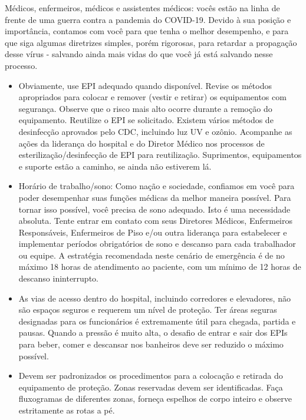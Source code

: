 \documentclass[onecolumn,journal]{IEEEtran}
\begin{document}


\begin{multicols}{2}

Médicos, enfermeiros, médicos e assistentes médicos: vocês estão na linha de frente de uma guerra contra a pandemia do COVID-19. Devido à sua posição e importância, contamos com você para que tenha o melhor desempenho, e para que siga algumas diretrizes simples, porém rigorosas, para retardar a propagação desse vírus - salvando ainda mais vidas do que você já está salvando nesse processo.

\begin{itemize}
    \item Obviamente, use EPI adequado quando disponível. Revise os métodos apropriados para colocar e remover (vestir e retirar) os equipamentos com segurança. Observe que o risco mais alto ocorre durante a remoção do equipamento. Reutilize o EPI se solicitado. Existem vários métodos de desinfecção aprovados pelo CDC, incluindo luz UV e ozônio.  Acompanhe as ações da liderança do hospital e do Diretor Médico nos processos de esterilização/desinfecção de EPI para reutilização. Suprimentos, equipamentos e suporte estão a caminho, se ainda não estiverem lá.
    \item Horário de trabalho/sono: Como nação e sociedade, confiamos em você para poder desempenhar suas funções médicas da melhor maneira possível. Para tornar isso possível, você precisa de sono adequado. Isto é uma necessidade absoluta. Tente entrar em contato com seus Diretores Médicos, Enfermeiros Responsáveis, Enfermeiros de Piso e/ou outra liderança para estabelecer e implementar períodos obrigatórios de sono e descanso para cada trabalhador ou equipe. A estratégia recomendada neste cenário de emergência é de no máximo 18 horas de atendimento ao paciente, com um mínimo de 12 horas de descanso ininterrupto.
    \item As vias de acesso dentro do hospital, incluindo corredores e elevadores, não são espaços seguros e requerem um nível de proteção. Ter áreas seguras designadas para os funcionários é extremamente útil para chegada, partida e pausas. Quando a pressão é muito alta, o desafio de entrar e sair dos EPIs para beber, comer e descansar nos banheiros deve ser reduzido o máximo possível.
    \item Devem ser padronizados os procedimentos para a colocação e retirada do equipamento de proteção. Zonas reservadas devem ser identificadas. Faça fluxogramas de diferentes zonas, forneça espelhos de corpo inteiro e observe estritamente as rotas a pé.

\end{itemize}
\end{multicols}
\end{document}

